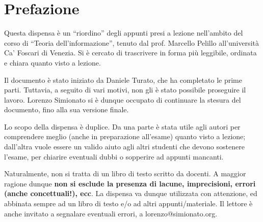 \chapter*{Prefazione}
Questa dispensa è un ``riordino'' degli appunti presi a lezione nell'ambito del corso di ``Teoria dell'informazione'', tenuto dal prof. Marcello Pelillo all'università Ca' Foscari di Venezia. Si è cercato di trascrivere in forma più leggibile, ordinata e chiara quanto visto a lezione.
 
Il documento è stato iniziato da Daniele Turato, che ha completato le prime parti. Tuttavia, a seguito di vari motivi, non gli è stato possibile proseguire il lavoro. Lorenzo Simionato si è dunque occupato di continuare la stesura del documento, fino alla sua versione finale.

Lo scopo della dispensa è duplice. Da una parte è stata utile agli autori per comprendere meglio (anche in preparazione all'esame) quanto visto a lezione; dall'altra vuole essere un valido aiuto agli altri studenti che devono sostenere l'esame, per chiarire eventuali dubbi o sopperire ad appunti mancanti.

Naturalmente, non si tratta di un libro di testo scritto da docenti. A maggior ragione dunque \textbf{non si esclude la presenza di lacune, imprecisioni, errori (anche concettuali!), ecc}. La dispensa va dunque utilizzata con attenzione, ed abbinata sempre 
ad un libro di testo e/o ad altri appunti/materiale.
Il lettore è anche invitato a segnalare eventuali errori, a lorenzo@simionato.org.